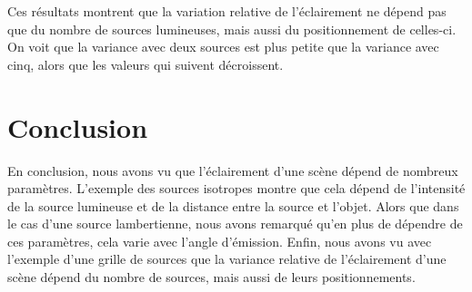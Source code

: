 \documentclass[a4paper,11pt]{article}
\begin{document}
  Ces résultats montrent que la variation relative de l'éclairement ne dépend pas que du nombre 
  de sources lumineuses, mais aussi du positionnement de celles-ci. On voit que la variance avec 
  deux sources est plus petite que la variance avec cinq, alors que les valeurs qui suivent décroissent.
  
  \section*{Conclusion}
  En conclusion, nous avons vu que l'éclairement d'une scène dépend de nombreux paramètres. L'exemple 
  des sources isotropes montre que cela dépend de l'intensité de la source lumineuse et de la distance 
  entre la source et l'objet. Alors que dans le cas d'une source lambertienne, nous avons remarqué qu'en 
  plus de dépendre de ces paramètres, cela varie avec l'angle d'émission.
  Enfin, nous avons vu avec l'exemple d'une grille de sources que la variance relative de l'éclairement 
  d'une scène dépend du nombre de sources, mais aussi de leurs positionnements.
    
\end{document}
